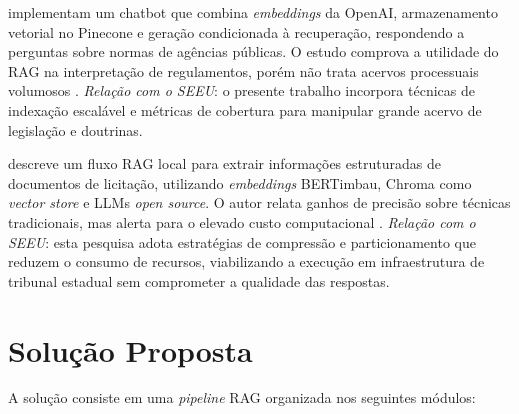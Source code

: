  implementam um chatbot que combina \textit{embeddings} da OpenAI, armazenamento vetorial no Pinecone e geração condicionada à recuperação, respondendo a perguntas sobre normas de agências públicas. O estudo comprova a utilidade do RAG na interpretação de regulamentos, porém não trata acervos processuais volumosos \cite{pujiono2024implementing}.  
\emph{Relação com o SEEU}: o presente trabalho incorpora técnicas de indexação escalável e métricas de cobertura para manipular grande acervo de legislação e doutrinas.

 descreve um fluxo RAG local para extrair informações estruturadas de documentos de licitação, utilizando \textit{embeddings} BERTimbau, Chroma como \textit{vector store} e LLMs \textit{open source}. O autor relata ganhos de precisão sobre técnicas tradicionais, mas alerta para o elevado custo computacional \cite{aquino2024extracting}.  
\emph{Relação com o SEEU}: esta pesquisa adota estratégias de compressão e particionamento que reduzem o consumo de recursos, viabilizando a execução em infraestrutura de tribunal estadual sem comprometer a qualidade das respostas.


\section{Solução Proposta}
\label{sub:solucao-proposta}

A solução consiste em uma \textit{pipeline} RAG organizada nos seguintes módulos:

